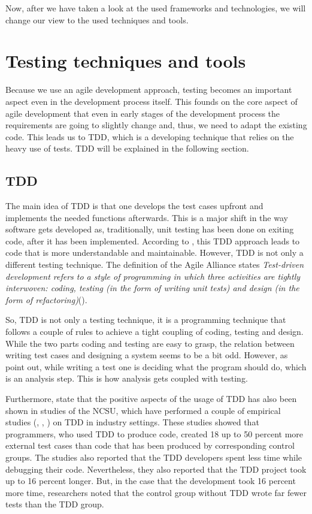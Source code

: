 Now, after we have taken a look at the used frameworks and technologies, we will change our view to the used techniques and tools.

\section{Testing techniques and tools}	
Because we use an agile development approach, testing becomes an important aspect even in the development process itself. This founds on the core aspect of agile development that even in early stages of the development process the requirements are going to slightly change and, thus, we need to adapt the existing code. This leads us to \ac{TDD}, which is a developing technique that relies on the heavy use of tests. \ac{TDD} will be explained in the following section. 

\subsection{TDD}
The main idea of \ac{TDD} is that one develops the test cases upfront and implements the needed functions afterwards. This is a major shift in the way software gets developed as, traditionally, unit testing has been done on exiting code, after it has been implemented. According to \cite{nerur2005}, this \ac{TDD} approach leads to code that is more understandable and maintainable. However, \ac{TDD} is not only a different testing technique. The definition of the Agile Alliance states \glqq\emph{Test-driven development refers to a style of programming in which three activities are tightly interwoven: coding, testing (in the form of writing unit tests) and design (in the form of refactoring)}\grqq (\cite{GAA2015}). 

So, \ac{TDD} is not only a testing technique, it is a programming technique that follows a couple of rules to achieve a tight coupling of coding, testing and design. While the two parts coding and testing are easy to grasp, the relation between writing test cases and designing a system seems to be a bit odd. However, as \cite{Janzen2005} point out, while writing a test one is deciding what the program should do, which is an analysis step. This is how analysis gets coupled with testing.

Furthermore, \cite{Janzen2005} state that the positive aspects of the usage of \ac{TDD} has also been shown in studies of the \ac{NCSU}, which have performed a couple of empirical studies (\cite{George2004}, \cite{max03}, \cite{Williams2003}) on TDD in industry settings.
These studies showed that programmers, who used \ac{TDD} to produce code, created 18 up to 50 percent more external test cases than code that has been produced by corresponding control groups. The studies also reported that the \ac{TDD} developers spent less time while debugging their code. Nevertheless, they also reported that the \ac{TDD} project took up to 16 percent longer. But, in the case that the development took 16 percent more time, researchers noted that the control group without \ac{TDD} wrote far fewer tests than the \ac{TDD} group. 

